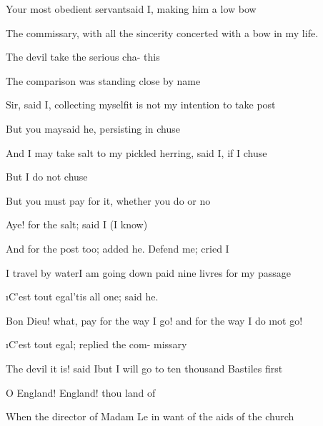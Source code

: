 \documentclass[twoside]{article}
\begin{document}
Your most obedient servant\tsh said I,\break
making him a low bow\tsh

The commissary, with all the sincerity\break
{}
concerted with a bow in my life.

\tshh The devil take the serious cha-\break
{}
this\tsh

The comparison was standing close by\break
{}
name\tsk

Sir, said I, collecting myself\tsk it is not\break
my intention to take post\tsh

\tskk But you may\tsk said he, persisting in\break
{}
chuse\tsh

\tskk And I may take salt to my pickled\break
herring, said I, if I chuse\tsh

\tskk But I do not chuse\tsk

\tskk But you must pay for it, whether\break
you do or no\tsh

Aye! for the salt; said I (I know)\tsh\break
{}
\parskip 7pt

\tskk And for the post too; added he.\break
Defend me; cried I\tsh

I travel by water\tsk I am going down\break
{}
paid nine livres for my passage\tsh

\i{C’est tout egal}\tsk ’tis all one; said he.

Bon Dieu! what, pay for the way I\break
go! and for the way I do \i{not} go!

\tshh \i{C’est tout egal}; replied the com-\break
missary\tsh

\tshh The devil it is! said I\tsk but I will\break
go to ten thousand Bastiles first\tsh

O England! England! thou land of\break
{}


When the director of Madam Le\break
{}
in want of the aids of the church\tsh
\end{document}
